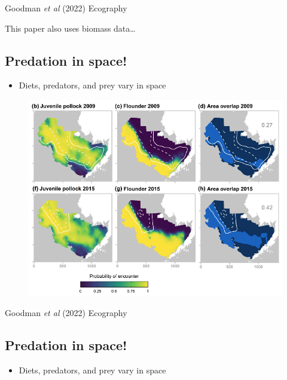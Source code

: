 \documentclass[
  letterpaper,
  DIV=11,
  numbers=noendperiod]{scrartcl}
\providecommand{\tightlist}{%
  \setlength{\itemsep}{0pt}\setlength{\parskip}{0pt}}\usepackage{longtable,booktabs,array}
\begin{document}
Goodman \emph{et al} (2022) Ecography

This paper also uses biomass data\ldots{}

\hypertarget{predation-in-space-1}{%
\subsection{Predation in space!}\label{predation-in-space-1}}

\begin{itemize}
\tightlist
\item
  Diets, predators, and prey vary in space
\end{itemize}

\begin{figure}

{\centering \includegraphics{images/goodman2.png}

}

\end{figure}

Goodman \emph{et al} (2022) Ecography

\hypertarget{predation-in-space-2}{%
\subsection{Predation in space!}\label{predation-in-space-2}}

\begin{itemize}
\tightlist
\item
  Diets, predators, and prey vary in space
\end{itemize}
\end{document}
